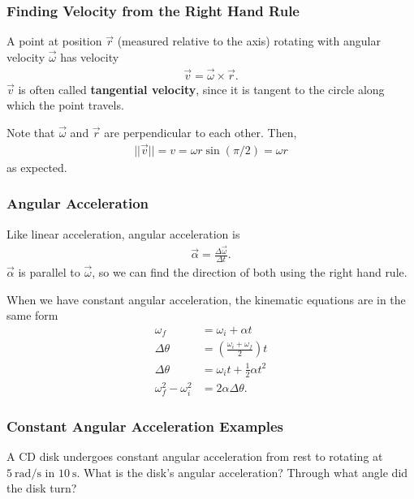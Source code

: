 \documentclass[20pt]{beamer}
\begin{document}
\begin{frame}
	\frametitle{Finding Velocity from the Right Hand Rule}
	\begin{theorem}
		A point at position $\vec{r}$ (measured relative to the axis) rotating with angular velocity $\vec{\omega}$ has velocity
		\begin{align*}
			\vec{v} = \vec{\omega} \times \vec{r}.
		\end{align*}
		$\vec{v}$ is often called \textbf{tangential velocity}, since it is tangent to the circle along which the point travels.
	\end{theorem}
	\begin{figure}[ht]
		\centering
		\label{fig:velcrossproduct}
	\end{figure}
	Note that $\vec{\omega}$ and $\vec{r}$ are perpendicular to each other. Then,
	\begin{align*}
		||\vec{v}|| = v = \omega r \sin (\pi / 2) = \omega r
	\end{align*}
	as expected.
\end{frame}

\begin{frame}
	\frametitle{Angular Acceleration}
	\begin{definition}
		Like linear acceleration, angular acceleration is
		\begin{align*}
			\vec{\alpha} = \frac{\Delta \vec{\omega}}{\Delta t}.
		\end{align*}
		$\vec{\alpha}$ is parallel to $\vec{\omega}$, so we can find the direction of both using the right hand rule.
	\end{definition}
	\begin{theorem}
		When we have constant angular acceleration, the kinematic equations are in the same form
		\begin{align*}
			\omega_f                & = \omega_i + \alpha t                          \\
			\Delta \theta           & = \left(\frac{\omega_i + \omega_f}{2}\right) t \\
			\Delta \theta           & = \omega_i t + \frac{1}{2}\alpha t^2           \\
			\omega_f^2 - \omega_i^2 & = 2 \alpha \Delta \theta.
		\end{align*}
	\end{theorem}
\end{frame}

\begin{frame}
	\frametitle{Constant Angular Acceleration Examples}
	\begin{example}
		A CD disk undergoes constant angular acceleration from rest to rotating at $\SI{5}{\radian/\second}$ in $\SI{10}{\second}$. What is the disk's angular acceleration? Through what angle did the disk turn?
	\end{example}
\end{frame}
\end{document}
